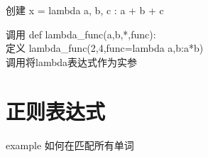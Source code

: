 \documentclass{beamer}
\begin{document}
\begin{frame}[t]
	\begin{block}{创建}
		x = lambda a, b, c : a + b + c
	\end{block}
	\pause
	\begin{block}{调用}
		def lambda\_func(a,b,*,func):\\定义
		lambda\_func(2,4,func=lambda a,b:a*b)\\调用将lambda表达式作为实参

	\end{block}
\end{frame}

\section{正则表达式}



\begin{frame}[t]
	\begin{block}{example}
	如何在匹配所有单词	
	\end{block}
	
\end{frame}
\end{document}
